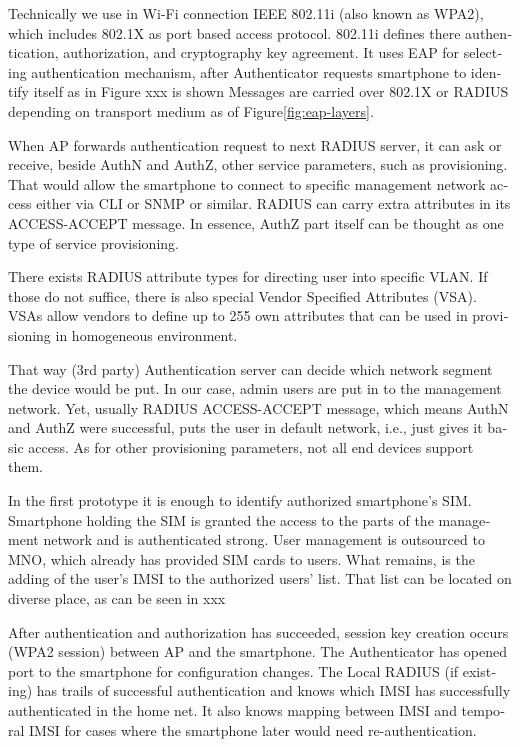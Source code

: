 \documentclass[12pt,a4paper,english]{tutthesis}
\begin{document}
\begin{otherlanguage}{english}
Technically we use in Wi-Fi connection IEEE 802.11i (also known as WPA2), which includes
802.1X as port based access protocol.  802.11i defines there
authentication, authorization, and cryptography key agreement.
 It uses EAP for selecting authentication 
mechanism, after Authenticator requests smartphone to identify itself as in Figure xxx is shown
Messages are carried over 802.1X or RADIUS depending on transport
medium as of Figure\ref{fig:eap-layers}.


When AP forwards authentication request to next RADIUS server, it can
ask or receive, beside AuthN and AuthZ, other service parameters, such
as provisioning. That would allow the smartphone to connect to
specific management network access either via CLI or SNMP or
 similar\cite[p.4]{rfc5608}.  RADIUS can carry extra attributes in its
ACCESS-ACCEPT message.   In essence, AuthZ part itself can be thought as
one type of service provisioning. 


There exists RADIUS attribute types for directing user into specific
VLAN. If those do not suffice, there is also special Vendor Specified
Attributes (VSA). VSAs allow vendors to define up to 255 own
attributes that can be used in provisioning in homogeneous environment. 


That way (3rd party) Authentication server can decide which network
segment the device would be put.  In our case, admin users are put in
to the management network.  Yet, usually RADIUS ACCESS-ACCEPT message,
which means AuthN and AuthZ were successful,  puts the user in
default network, i.e., just gives it basic access. As for other
provisioning parameters, not all end devices support them.

In the first prototype it is enough to identify authorized
smartphone's SIM.  Smartphone holding the SIM is granted the access to
the parts of the management network and is authenticated strong.  User
management is outsourced to MNO, which
already has provided SIM cards to users. What remains, is the adding
of the user's IMSI to the authorized users' list. That list can be
located on diverse place, as can be seen in xxx


After authentication and authorization has succeeded, session key
creation occurs (WPA2 session) between AP and the smartphone. 
The Authenticator has opened port to the smartphone for
configuration changes. 
The Local RADIUS (if existing) has trails of successful
authentication and knows which IMSI has successfully authenticated in
the home net. It also knows mapping between IMSI and temporal IMSI for
cases where the smartphone later would need  re-authentication.




\end{otherlanguage}
\end{document}
